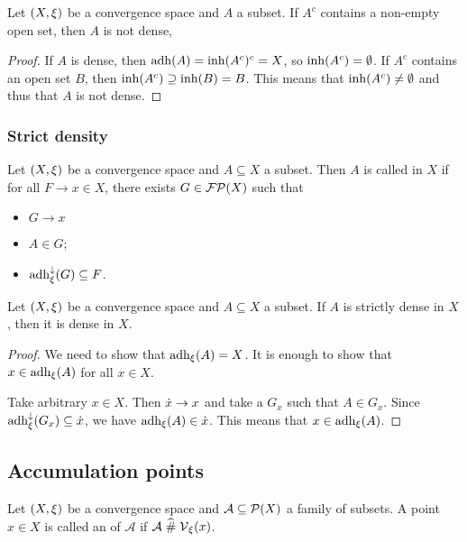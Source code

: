 \begin{lemma} \label{openDensityLemma}
Let $\sSet{X, \xi}$ be a convergence space and $A$ a subset.
If $A^c$ contains a non-empty open set, then $A$ is not dense,
\end{lemma}
\begin{proof}
If $A$ is dense, then $\operatorname{adh}(A) = \operatorname{inh}(A^c)^c = X$, so $\operatorname{inh}(A^c) = \emptyset$. If $A^c$ contains an open set $B$, then $\operatorname{inh}(A^c) \supseteq \operatorname{inh}(B) = B$. This means that $\operatorname{inh}(A^c) \neq \emptyset$ and thus that $A$ is not dense.
\end{proof}

\subsubsection{Strict density}
\begin{definition}
Let $\sSet{X,\xi}$ be a convergence space and $A\subseteq X$ a subset. Then $A$ is called  in $X$ if for all $F\to x\in X$, there exists $G\in \operatorname{\mathcal{FP}}(X)$ such that
\begin{itemize}
\item $G\to x$
\item $A\in G$;
\item $\operatorname{adh}_\xi^\downarrow(G)\subseteq F$.
\end{itemize} 
\end{definition}

\begin{lemma}
Let $\sSet{X,\xi}$ be a convergence space and $A\subseteq X$ a subset. If $A$ is strictly dense in $X$, then it is dense in $X$.
\end{lemma}
\begin{proof}
We need to show that $\operatorname{adh}_\xi(A) = X$. It is enough to show that $x\in \operatorname{adh}_\xi(A)$ for all $x\in X$.

Take arbitrary $x\in X$. Then $\dot{x}\to x$ and take a $G_x$ such that $A\in G_x$. Since $\operatorname{adh}_\xi^\downarrow(G_x)\subseteq \dot{x}$, we have $\operatorname{adh}_\xi(A) \in \dot{x}$. This means that $x\in \operatorname{adh}_\xi(A)$. 
\end{proof}


\subsection{Accumulation points}
\begin{definition}
Let $\sSet{X,\xi}$ be a convergence space and $\mathcal{A}\subseteq \operatorname{\mathcal{P}}(X)$ a family of subsets. A point $x\in X$ is called an  of $\mathcal{A}$ if $\mathcal{A}\mathrel{\widehat{\#}} \operatorname{\mathcal{V}}_\xi(x)$.
\end{definition}

